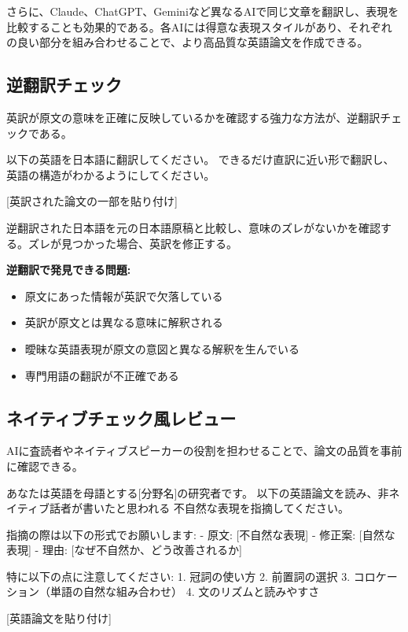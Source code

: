さらに、Claude、ChatGPT、Geminiなど異なるAIで同じ文章を翻訳し、表現を比較することも効果的である。各AIには得意な表現スタイルがあり、それぞれの良い部分を組み合わせることで、より高品質な英語論文を作成できる。

\subsection{逆翻訳チェック}

英訳が原文の意味を正確に反映しているかを確認する強力な方法が、逆翻訳チェックである。

\begin{promptbox}
以下の英語を日本語に翻訳してください。
できるだけ直訳に近い形で翻訳し、英語の構造がわかるようにしてください。

{[}英訳された論文の一部を貼り付け]
\end{promptbox}

逆翻訳された日本語を元の日本語原稿と比較し、意味のズレがないかを確認する。ズレが見つかった場合、英訳を修正する。

\textbf{逆翻訳で発見できる問題:}

\begin{itemize}
\item 原文にあった情報が英訳で欠落している
\item 英訳が原文とは異なる意味に解釈される
\item 曖昧な英語表現が原文の意図と異なる解釈を生んでいる
\item 専門用語の翻訳が不正確である
\end{itemize}

\subsection{ネイティブチェック風レビュー}

AIに査読者やネイティブスピーカーの役割を担わせることで、論文の品質を事前に確認できる。

\begin{promptbox}
あなたは英語を母語とする[分野名]の研究者です。
以下の英語論文を読み、非ネイティブ話者が書いたと思われる
不自然な表現を指摘してください。

指摘の際は以下の形式でお願いします:
- 原文: [不自然な表現]
- 修正案: [自然な表現]
- 理由: [なぜ不自然か、どう改善されるか]

特に以下の点に注意してください:
1. 冠詞の使い方
2. 前置詞の選択
3. コロケーション（単語の自然な組み合わせ）
4. 文のリズムと読みやすさ

{[}英語論文を貼り付け]
\end{promptbox}

